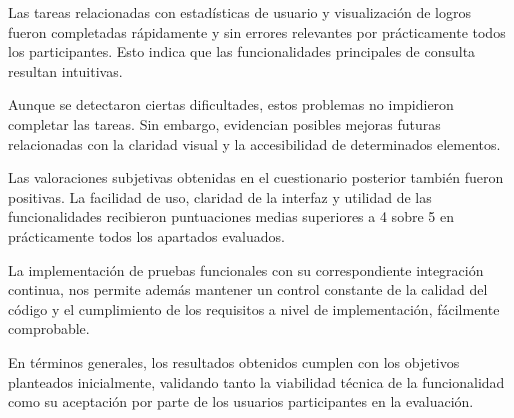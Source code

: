 Las tareas relacionadas con estadísticas de usuario y visualización de logros fueron completadas rápidamente y sin errores relevantes por prácticamente todos los participantes. Esto indica que las funcionalidades principales de consulta resultan intuitivas.

Aunque se detectaron ciertas dificultades, estos problemas no impidieron completar las tareas. Sin embargo, evidencian posibles mejoras futuras relacionadas con la claridad visual y la accesibilidad de determinados elementos.

Las valoraciones subjetivas obtenidas en el cuestionario posterior también fueron positivas. La facilidad de uso, claridad de la interfaz y utilidad de las funcionalidades recibieron puntuaciones medias superiores a 4 sobre 5 en prácticamente todos los apartados evaluados.

La implementación de pruebas funcionales con su correspondiente integración continua, nos permite además mantener un control constante de la calidad del código y el cumplimiento de los requisitos a nivel de implementación, fácilmente comprobable.

En términos generales, los resultados obtenidos cumplen con los objetivos planteados inicialmente, validando tanto la viabilidad técnica de la funcionalidad como su aceptación por parte de los usuarios participantes en la evaluación.